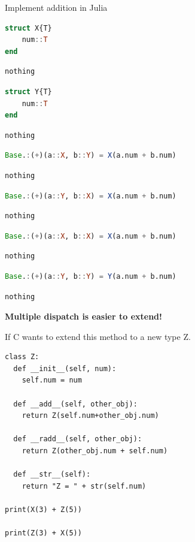 \documentclass[
  notoc %
]{tufte-book}
\begin{document}
Implement addition in Julia

\begin{lstlisting}[language=Julia]
struct X{T}
    num::T
end
\end{lstlisting}

\begin{lstlisting}[language=Output]
nothing
\end{lstlisting}

\begin{lstlisting}[language=Julia]
struct Y{T}
    num::T
end
\end{lstlisting}

\begin{lstlisting}[language=Output]
nothing
\end{lstlisting}

\begin{lstlisting}[language=Julia]
Base.:(+)(a::X, b::Y) = X(a.num + b.num)
\end{lstlisting}

\begin{lstlisting}[language=Output]
nothing
\end{lstlisting}

\begin{lstlisting}[language=Julia]
Base.:(+)(a::Y, b::X) = X(a.num + b.num)
\end{lstlisting}

\begin{lstlisting}[language=Output]
nothing
\end{lstlisting}

\begin{lstlisting}[language=Julia]
Base.:(+)(a::X, b::X) = X(a.num + b.num)
\end{lstlisting}

\begin{lstlisting}[language=Output]
nothing
\end{lstlisting}

\begin{lstlisting}[language=Julia]
Base.:(+)(a::Y, b::Y) = Y(a.num + b.num)
\end{lstlisting}

\begin{lstlisting}[language=Output]
nothing
\end{lstlisting}

\textbf{Multiple dispatch is easier to extend!}

If C wants to extend this method to a new type Z.

\begin{lstlisting}
class Z:
  def __init__(self, num):
    self.num = num

  def __add__(self, other_obj):
    return Z(self.num+other_obj.num)

  def __radd__(self, other_obj):
    return Z(other_obj.num + self.num)

  def __str__(self):
    return "Z = " + str(self.num)

print(X(3) + Z(5))

print(Z(3) + X(5))
\end{lstlisting}
\end{document}
